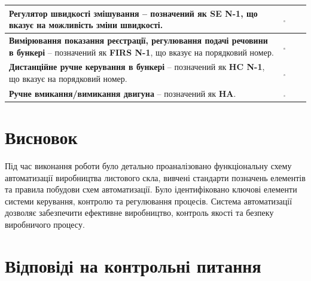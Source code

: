 \documentclass[a4paper]{article}
\begin{document}
\begin{table}[h!]
\begin{tabular}{|p{}|p{}|}
\textbf{Регулятор швидкості змішування} – позначений як \textbf{SE N-1}, що вказує на можливість зміни швидкості. & 
\includegraphics[width=0.1\textwidth]{imgs/PW2.6.png} \\ \hline

\textbf{Вимірювання показання реєстрації, регулювання подачі речовини в бункері} – позначений як \textbf{FIRS N-1}, що вказує на порядковий номер. & 
\includegraphics[width=0.1\textwidth]{imgs/PW2.7.png} \\ \hline

\textbf{Дистанційне ручне керування в бункері} – позначений як \textbf{HC N-1}, що вказує на порядковий номер. & 
\includegraphics[width=0.1\textwidth]{imgs/PW2.8.png} \\ \hline

\textbf{Ручне вмикання/вимикання двигуна} – позначений як \textbf{HA}. & 
\includegraphics[width=0.1\textwidth]{imgs/PW2.9.png} \\ \hline
\end{tabular}
\end{table}

\newpage

\section*{Висновок}
Під час виконання роботи було детально проаналізовано функціональну схему автоматизації виробництва листового скла, вивчені стандарти позначень елементів та правила побудови схем автоматизації. Було ідентифіковано ключові елементи системи керування, контролю та регулювання процесів. Система автоматизації дозволяє забезпечити ефективне виробництво, контроль якості та безпеку виробничого процесу.


\section*{Відповіді на контрольні питання}
\end{document}
